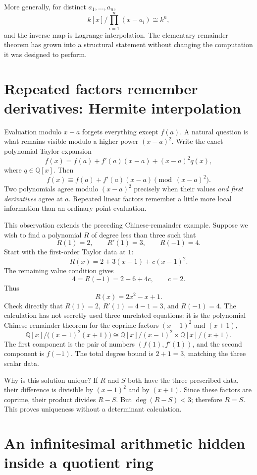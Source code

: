 More generally, for distinct \(a_1,\ldots,a_n\),
\[
  k[x]/\prod_{i=1}^n(x-a_i)
  \cong k^n,
\]
and the inverse map is Lagrange interpolation.  The elementary remainder theorem has grown into a structural statement without changing the computation it was designed to perform.

\section{Repeated factors remember derivatives: Hermite interpolation}

Evaluation modulo $x-a$ forgets everything except $f(a)$. A natural question is what remains visible modulo a higher power $(x-a)^2$. Write the exact polynomial Taylor expansion
\[
 f(x)=f(a)+f'(a)(x-a)+(x-a)^2q(x),
\]
where $q\in\mathbb Q[x]$. Then
\[
 \boxed{f(x)\equiv f(a)+f'(a)(x-a)
                  \pmod{(x-a)^2}.}
\]
Two polynomials agree modulo $(x-a)^2$ precisely when their values \emph{and first derivatives} agree at $a$. Repeated linear factors remember a little more local information than an ordinary point evaluation.

This observation extends the preceding Chinese-remainder example. Suppose we wish to find a polynomial $R$ of degree less than three such that
\[
 R(1)=2,\qquad R'(1)=3,\qquad R(-1)=4.
\]
Start with the first-order Taylor data at $1$:
\[
 R(x)=2+3(x-1)+c(x-1)^2.
\]
The remaining value condition gives
\[
 4=R(-1)=2-6+4c,
 \qquad c=2.
\]
Thus
\[
 \boxed{R(x)=2x^2-x+1.}
\]
Check directly that $R(1)=2$, $R'(1)=4-1=3$, and $R(-1)=4$. The calculation has not secretly used three unrelated equations: it is the polynomial Chinese remainder theorem for the coprime factors $(x-1)^2$ and $(x+1)$,
\[
 \mathbb Q[x]/\bigl((x-1)^2(x+1)\bigr)
 \cong
 \mathbb Q[x]/(x-1)^2\times\mathbb Q[x]/(x+1).
\]
The first component is the pair of numbers $(f(1),f'(1))$, and the second component is $f(-1)$. The total degree bound is $2+1=3$, matching the three scalar data.

Why is this solution unique? If $R$ and $S$ both have the three prescribed data, their difference is divisible by $(x-1)^2$ and by $(x+1)$. Since these factors are coprime, their product divides $R-S$. But $\deg(R-S)<3$; therefore $R=S$. This proves uniqueness without a determinant calculation.

\section{An infinitesimal arithmetic hidden inside a quotient ring}

